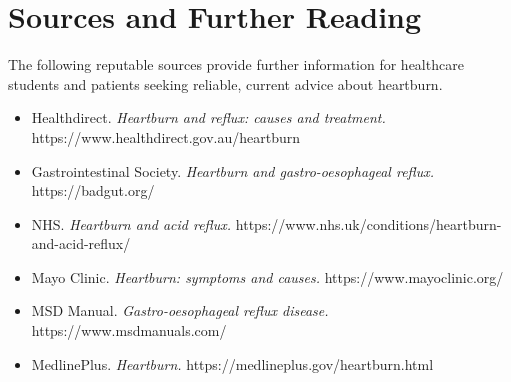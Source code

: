 \section*{Sources and Further Reading}
The following reputable sources provide further information for healthcare students and patients seeking reliable, current advice about heartburn.

\begin{itemize}
    \item Healthdirect. \textit{Heartburn and reflux: causes and treatment.} https://www.healthdirect.gov.au/heartburn
    \item Gastrointestinal Society. \textit{Heartburn and gastro-oesophageal reflux.} https://badgut.org/
    \item NHS. \textit{Heartburn and acid reflux.} https://www.nhs.uk/conditions/heartburn-and-acid-reflux/
    \item Mayo Clinic. \textit{Heartburn: symptoms and causes.} https://www.mayoclinic.org/
    \item MSD Manual. \textit{Gastro-oesophageal reflux disease.} https://www.msdmanuals.com/
    \item MedlinePlus. \textit{Heartburn.} https://medlineplus.gov/heartburn.html
\end{itemize}
